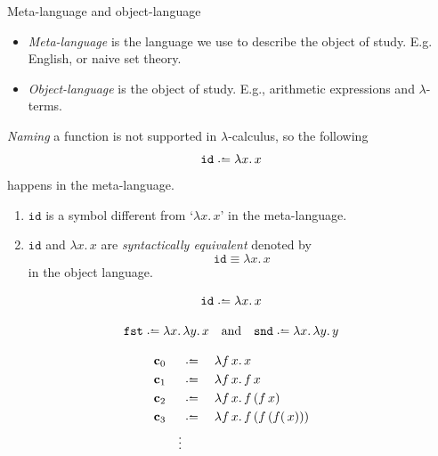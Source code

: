 \begin{frame}{Meta-language and object-language}
  \begin{itemize}
    \item \emph{Meta-language} is the language we use to describe the object of
      study. E.g. English, or naive set theory. 
    \item \emph{Object-language} is the object of study. E.g., arithmetic
      expressions and $\lambda$-terms.
  \end{itemize}
  \emph{Naming} a function is not supported in $\lambda$-calculus, so
  the following
    \[
      \mathtt{id} \defeq \lambda x.\, x
    \]
  happens in the meta-language. 
  \begin{enumerate}
    \item $\mathtt{id}$ is a symbol different from `$\lambda x.\,x$' in the meta-language.
    \item $\mathtt{id}$ and $\lambda x.\, x$ are \emph{syntactically equivalent} denoted by
      \[
        \mathtt{id} \equiv \lambda x.\, x
      \]
      in the object language.
  \end{enumerate}
\end{frame}

\begin{frame}
  \begin{example}
    \[
      \mathtt{id} \defeq \lambda x.\, x
    \]
  \end{example}

  \begin{example}[Projections]
    \[
      \mathtt{fst} \defeq \lambda x.\, \lambda y.\, x
      \quad\text{and}\quad \mathtt{snd} \defeq \lambda x.\, \lambda y.\, y
    \]
  \end{example}
  \begin{example}
    \begin{align*}
      &\bc_{0}   &&\defeq \;&& \lambda f\,x.\, x \\
      &\bc_{1} &&\defeq \;&& \lambda f\,x.\, f\,x \\
      &\bc_{2} &&\defeq \;&& \lambda f\,x.\, f\,(f\,x) \\
      &\bc_{3} &&\defeq \;&& \lambda f\,x.\, f\,(f\,(f(\,x))) \\
      && \vdots 
    \end{align*}
  \end{example}
\end{frame}

